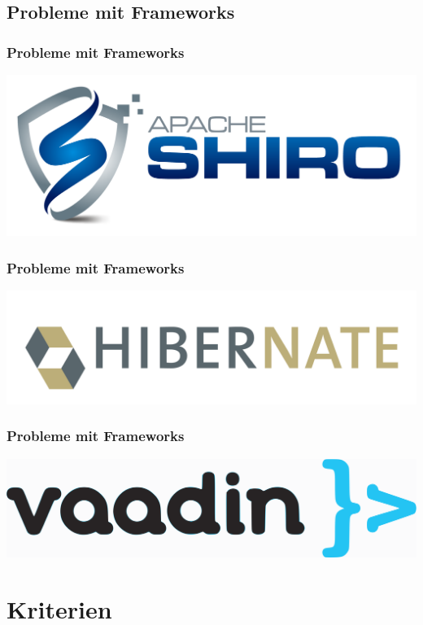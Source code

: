\subsection{Probleme mit Frameworks}

\begin{frame}
	\frametitle{Probleme mit Frameworks}
	\includegraphics{images/shiro-logo.png}
\end{frame}

\begin{frame}
	\frametitle{Probleme mit Frameworks}
	\includegraphics{images/hibernate-logo.png}
\end{frame}

\begin{frame}
	\frametitle{Probleme mit Frameworks}
	\includegraphics{images/vaadin-logo.png}
\end{frame}



\section{Kriterien}

